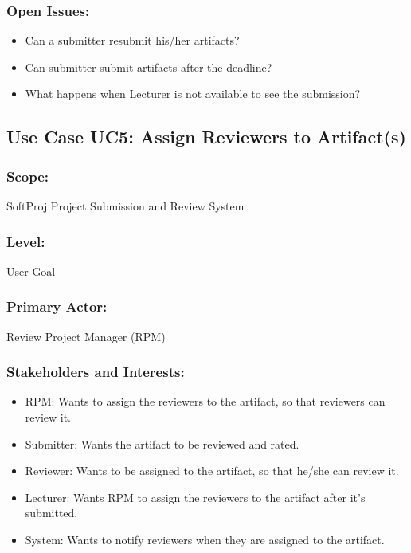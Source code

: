      
     
     \subsubsection*{Open Issues:}
    \begin{itemize}
    \itemsep-1em 
       \item Can a submitter resubmit his/her artifacts? 
       \item Can submitter submit artifacts after the deadline?
       \item What happens when Lecturer is not available to see the submission?
    \end{itemize}
    
    
    
    \newpage
    
    \subsection*{Use Case UC5: Assign Reviewers to Artifact(s)}
    \subsubsection*{Scope:} SoftProj Project Submission and Review System
    \subsubsection*{\textbf{Level:} }User Goal
    \subsubsection*{\textbf{Primary Actor:} } Review Project Manager (RPM)
    \subsubsection*{\textbf{Stakeholders and Interests:}}
    \begin{itemize}
    \itemsep-1em 
        \item RPM: Wants to assign the reviewers to the artifact, so that reviewers can review it.
        \item Submitter:  Wants the artifact to be reviewed and rated.
         \item Reviewer:  Wants to be assigned to the artifact, so that he/she can review it.
          \item Lecturer:  Wants RPM to assign the reviewers to the artifact after it’s submitted.
         \item System:  Wants to notify reviewers when they are assigned to the artifact.
    \end{itemize}
    
